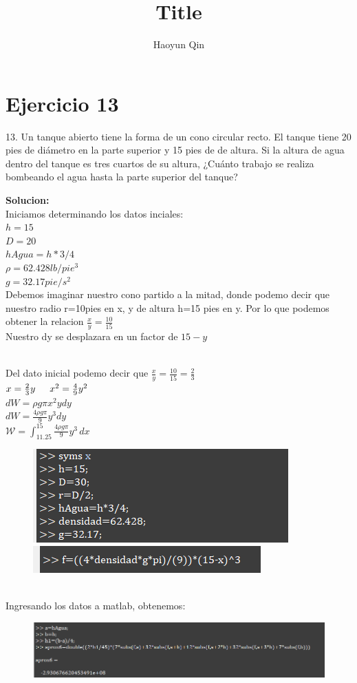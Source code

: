 \documentclass{article}
\title{Title}
\author{Haoyun Qin}
\theoremstyle{mytheoremstyle}
\theoremstyle{mytheoremstyle}
\theoremstyle{myproblemstyle}
\begin{document}
\section*{Ejercicio 13}
13. Un tanque abierto tiene la forma de un cono circular recto. El tanque tiene 20 pies de diámetro en la 
parte superior y 15 pies de de altura. Si la altura de agua dentro del tanque es tres cuartos de su altura, 
¿Cuánto trabajo se realiza bombeando el agua hasta la parte superior del tanque?


\textbf{Solucion:}
\\Iniciamos determinando los datos inciales:
\\$h=15$
\\$D=20$
\\$hAgua=h*3/4$
\\$\rho=62.428 lb/pie^3$
\\$g=32.17pie/s^2$
\\Debemos imaginar nuestro cono partido a la mitad, donde podemo decir que nuestro radio r=10pies en x, y de altura h=15 pies en y.
Por lo que podemos obtener la relacion $\frac{x}{y}=\frac{10}{15}$
\\Nuestro dy se desplazara en un factor de $15-y$

\noindent\\Del dato inicial podemo decir que $\frac{x}{y}=\frac{10}{15}=\frac{2}{3}$
\\$x=\frac{2}{3}y \indent x^2=\frac{4}{9}y^2$
\noindent \\ $dW=\rho g\pi x^2y dy$
\\$dW= \frac{4\rho g\pi}{9}y^3  dy$
\\$\mathcal{W}=\int_{11.25}^{15} \frac{4\rho g\pi}{9}y^3 \,dx  $
\begin{figure}[ht]
    \includegraphics*[scale=0.7]{img/nc13_2.png}\\
    \includegraphics*[scale=0.7]{img/nc13_3.png}
\end{figure}
\\Ingresando los datos a matlab, obtenemos:
\begin{figure}[ht]
    \includegraphics*[scale=0.7]{img/nc13_4.png}
\end{figure}
\end{document}
